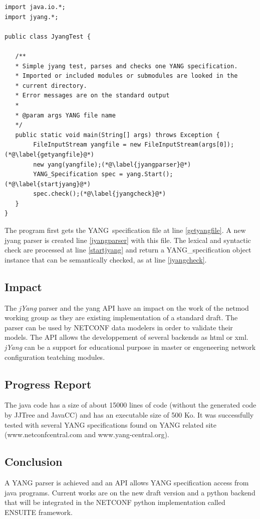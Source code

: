 \documentclass[a4paper]{article}
\begin{document}
\begin{lstlisting}
import java.io.*;
import jyang.*;

public class JyangTest {

   /**
   * Simple jyang test, parses and checks one YANG specification.
   * Imported or included modules or submodules are looked in the 
   * current directory.
   * Error messages are on the standard output
   * 
   * @param args YANG file name
   */
   public static void main(String[] args) throws Exception {
        FileInputStream yangfile = new FileInputStream(args[0]);(*@\label{getyangfile}@*)
        new yang(yangfile);(*@\label{jyangparser}@*)
        YANG_Specification spec = yang.Start();(*@\label{startjyang}@*)
        spec.check();(*@\label{jyangcheck}@*)
   }
}
\end{lstlisting}

The   program  first  gets   the  YANG\   specification  file   at  line
\ref{getyangfile}.    A    new   jyang   parser    is   created   line
\ref{jyangparser} with this file.  The lexical and syntactic check are
processed  at line  \ref{startjyang} and  return  a YANG\_specification
object  instance  that  can   be  semantically  checked,  as  at  line
\ref{jyangcheck}.



\subsection{Impact}

The {\sl jYang\/}  parser and the yang API have an  impact on the work
of the netmod  working group as they are  existing implementation of a
standard draft.   The parser can be  used by NETCONF  data modelers in
order to validate  their models.  The API allows  the developpement of
several backends as  html or xml.  {\sl jYang\/} can  be a support for
educational  purpose in  master or  engeneering  network configuration
teatching modules.


\subsection{Progress Report}

The java  code has a  size of about  15000 lines of code  (without the
generated code by JJTree and JavaCC) and has an executable size of 500
Ko. It was successfully  tested with several YANG specifications found
on      YANG     related     site      (www.netconfcentral.com     and
www.yang-central.org).

\subsection{Conclusion}

A YANG parser is achieved and an API allows YANG specification access
from java programs. Current works are on the new draft version
\cite{yang02} and a python backend that will be integrated in the
NETCONF python implementation called ENSUITE
framework\cite{CRIDLIG:2005:INRIA-00000804:1}.




\end{document}

